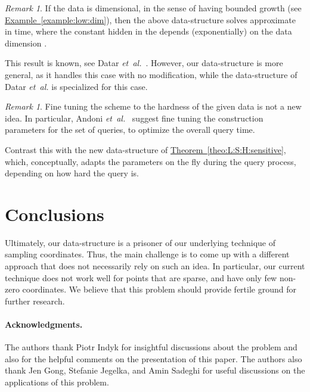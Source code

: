 \documentclass[12pt]{article}\usepackage[cm]{fullpage}
\newcommand{\etal}{\textit{et~al.}\xspace}
\theoremstyle{remark}\theoremheaderfont{\sf}\theorembodyfont{\upshape}\newtheorem{defn}[theorem]{Definition}
\newtheorem{remark}[theorem]{Remark}\newtheorem{example}[theorem]{Example}\newtheorem*{remark:unnumbered}[theorem]{Remark}
\numberwithin{figure}{section}\numberwithin{table}{section}\numberwithin{equation}{section}
\newcommand{\HLink}[2]{\hyperref[#2]{#1~\ref*{#2}}}
\newcommand{\exmref}[1]{\HLink{Example}{example:#1}}
\newcommand{\remlab}[1]{\label{rem:#1}}
\newcommand{\thmref}[1]{\HLink{Theorem}{theo:#1}}
\newcommand{\si}[1]{#1}\newcommand{\IntRange}[1]{\left\llbracket #1 \right\rrbracket}
\begin{document}
\begin{remark}
    \remlab{l:dim}If the data is  dimensional, in the sense of having bounded
    growth (see \exmref{low:dim}), then the above data-structure
    solves approximate \LSH in  time, where the constant
    hidden in the  depends (exponentially) on the data dimension
    .

    This result is known, see Datar \etal~\cite[Appendix
    A]{diim-lshsb-04}. However, our data-structure is more general, as
    it handles this case with no modification, while the
    data-structure of Datar \etal is specialized for this case.
\end{remark}

\begin{remark}
    \remlab{f:tune}Fine tuning the \LSH scheme to the hardness of the given data is
    not a new idea. In particular, Andoni \etal~\cite[Section
    4.3.1]{adiim-lshus-06} suggest fine tuning the \LSH construction
    parameters for the set of queries, to optimize the overall query
    time.

    Contrast this with the new data-structure of
    \thmref{L:S:H:sensitive}, which, conceptually, adapts the
    parameters on the fly during the query process, depending on how
    hard the query is.
\end{remark}







\section{Conclusions}

Ultimately, our data-structure is a prisoner of our underlying
technique of sampling coordinates. Thus, the main challenge is to come
up with a different approach that does not necessarily rely on such an
idea. In particular, our current technique does not work well for
points that are sparse, and have only few non-zero coordinates. We
believe that this problem should provide fertile ground for further
research.

\paragraph{Acknowledgments.}
The authors thank Piotr Indyk for insightful discussions about the
problem and also for the helpful comments on the presentation of this
paper.  The authors also thank \si{Jen} Gong, Stefanie Jegelka, and
Amin Sadeghi for useful discussions on the applications of this
problem.
\end{document}
